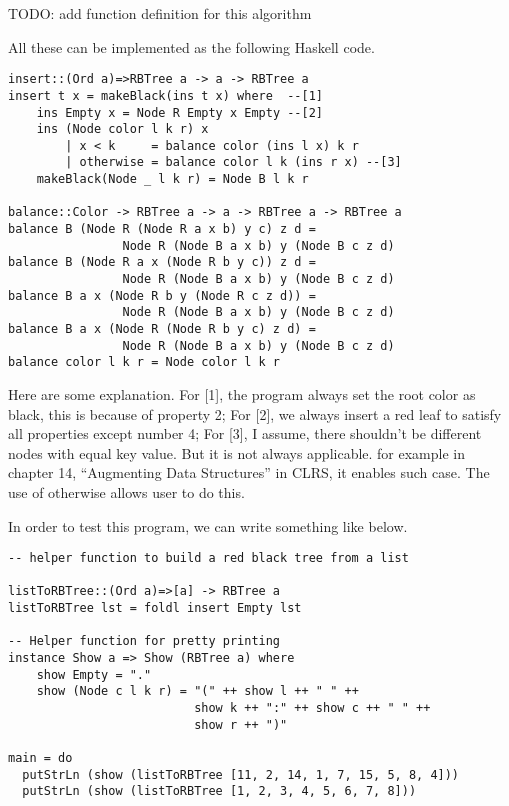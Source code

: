 \documentclass{article}
\begin{document}
TODO: add function definition for this algorithm

All 
these can be implemented as the following Haskell code.

\lstset{language=Haskell}
\begin{lstlisting}
insert::(Ord a)=>RBTree a -> a -> RBTree a
insert t x = makeBlack(ins t x) where  --[1]
    ins Empty x = Node R Empty x Empty --[2]
    ins (Node color l k r) x 
        | x < k     = balance color (ins l x) k r
        | otherwise = balance color l k (ins r x) --[3]
    makeBlack(Node _ l k r) = Node B l k r

balance::Color -> RBTree a -> a -> RBTree a -> RBTree a
balance B (Node R (Node R a x b) y c) z d = 
                Node R (Node B a x b) y (Node B c z d)
balance B (Node R a x (Node R b y c)) z d = 
                Node R (Node B a x b) y (Node B c z d)
balance B a x (Node R b y (Node R c z d)) = 
                Node R (Node B a x b) y (Node B c z d)
balance B a x (Node R (Node R b y c) z d) = 
                Node R (Node B a x b) y (Node B c z d)
balance color l k r = Node color l k r
\end{lstlisting}

Here are some explanation. For [1], the program always set the root
color as black, this is because of property 2; For [2], we always insert
a red leaf to satisfy all properties except number 4; For [3], I assume, 
there shouldn't be different nodes with equal key value. But it is not always
applicable. for example in chapter 14, ``Augmenting Data Structures'' in CLRS\cite{CLRS}, it enables such case. The use of otherwise allows user to do this.

In order to test this program, we can write something like below.

\begin{lstlisting}
-- helper function to build a red black tree from a list

listToRBTree::(Ord a)=>[a] -> RBTree a
listToRBTree lst = foldl insert Empty lst

-- Helper function for pretty printing
instance Show a => Show (RBTree a) where
    show Empty = "."
    show (Node c l k r) = "(" ++ show l ++ " " ++ 
                          show k ++ ":" ++ show c ++ " " ++ 
                          show r ++ ")"

main = do
  putStrLn (show (listToRBTree [11, 2, 14, 1, 7, 15, 5, 8, 4]))
  putStrLn (show (listToRBTree [1, 2, 3, 4, 5, 6, 7, 8]))
\end{lstlisting}
\end{document}

